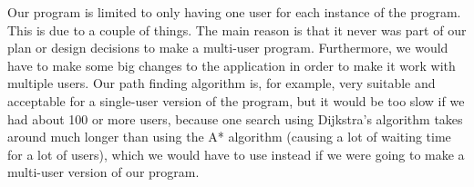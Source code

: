 Our program is limited to only having one user for each instance of the program. This is due to a couple of things. The main reason is that it never was part of our plan or design decisions to make a multi-user program. Furthermore, we would have to make some big changes to the application in order to make it work with multiple users. Our path finding algorithm is, for example, very suitable and acceptable for a single-user version of the program, but it would be too slow if we had about 100 or more users, because one search using Dijkstra's algorithm takes around much longer than using the A* algorithm (causing a lot of waiting time for a lot of users), which we would have to use instead if we were going to make a multi-user version of our program.
